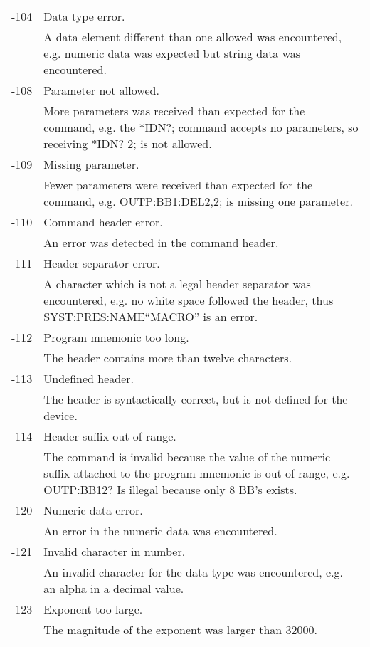 \begin{longtable}{|l|p{25em}|}
-104			& Data type error.\\ \cline{2-2}
					& A data element different than one allowed was encountered, e.g. numeric data was expected but string data was encountered. \\ \hline
-108			& Parameter not allowed.\\ \cline{2-2}
					& More parameters was received than expected for the command, e.g. the *IDN?; command accepts no parameters, so receiving *IDN? 2; is not allowed.\\ \hline
-109			& Missing parameter.\\ \cline{2-2}
					& Fewer parameters were received than expected for the command, e.g. OUTP:BB1:DEL2,2; is missing one parameter.\\ \hline
-110			& Command header error.\\ \cline{2-2}
					& An error was detected in the command header.\\ \hline
-111			& Header separator error.\\ \cline{2-2}
					& A character which is not a legal header separator was encountered, e.g. no white space followed the header, thus SYST:PRES:NAME``MACRO'' is an error.\\ \hline
-112			& Program mnemonic too long.\\ \cline{2-2}
					& The header contains more than twelve characters.\\ \hline
-113			& Undefined header.\\ \cline{2-2}
					& The header is syntactically correct, but is not defined for the device.\\ \hline
-114			& Header suffix out of range.\\ \cline{2-2}
					& The command is invalid because the value of the numeric suffix attached to the program mnemonic is out of range, e.g. OUTP:BB12? Is illegal because only 8 BB's exists.\\ \hline
-120			& Numeric data error.\\ \cline{2-2}
					& An error in the numeric data was encountered.\\ \hline
-121			& Invalid character in number.\\ \cline{2-2}
					& An invalid character for the data type was encountered, e.g. an alpha in a decimal value.\\ \hline
-123			& Exponent too large.\\ \cline{2-2}
					& The magnitude of the exponent was larger than 32000.\\ \hline

\end{longtable}
